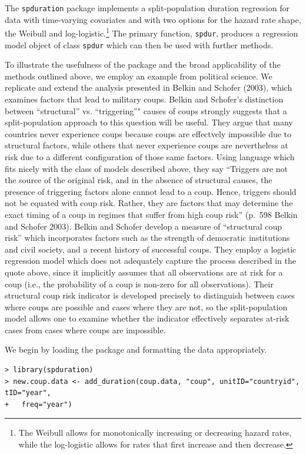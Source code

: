 \documentclass[]{article}
\let\rmarkdownfootnote\footnote%
\def\footnote{\protect\rmarkdownfootnote}
\begin{document}
The \texttt{spduration} package implements a split-population duration
regression for data with time-varying covariates and with two options
for the hazard rate shape, the Weibull and
log-logistic.\footnote{The Weibull allows for monotonically increasing or decreasing hazard rates, while the log-logistic allows for rates that first increase and then decrease.}
The primary function, \texttt{spdur}, produces a regression model object
of class \texttt{spdur} which can then be used with further methods.

To illustrate the usefulness of the package and the broad applicability
of the methods outlined above, we employ an example from political
science. We replicate and extend the analysis presented in Belkin and
Schofer (2003), which examines factors that lead to military coups.
Belkin and Schofer's distinction between ``structural'' vs.
``triggering''" causes of coups strongly suggests that a
split-population approach to this question will be useful. They argue
that many countries never experience coups because coups are effectvely
impossible due to structural factors, while others that never experience
coups are nevertheless at risk due to a different configuration of those
same factors. Using language which fits nicely with the class of models
described above, they say ``Triggers are not the source of the original
risk, and in the absence of structural causes, the presence of
triggering factors alone cannot lead to a coup. Hence, triggers should
not be equated with coup risk. Rather, they are factors that may
determine the exact timing of a coup in regimes that suffer from high
coup risk'' (p.~598 Belkin and Schofer 2003). Belkin and Schofer develop
a measure of ``structural coup risk'' which incorporates factors such as
the strength of democratic institutions and civil society, and a recent
history of successful coups. They employ a logistic regression model
which does not adequately capture the process described in the quote
above, since it implicitly assumes that all observations are at risk for
a coup (i.e., the probability of a coup is non-zero for all
observations). Their structural coup risk indicator is developed
precisely to distinguish between cases where coups are possible and
cases where they are not, so the split-population model allows one to
examine whether the indicator effectively separates at-risk cases from
cases where coups are impossible.

We begin by loading the package and formatting the data appropriately.
\small

\begin{verbatim}
> library(spduration)
> new.coup.data <- add_duration(coup.data, "coup", unitID="countryid", tID="year", 
+   freq="year")
\end{verbatim}
\end{document}
